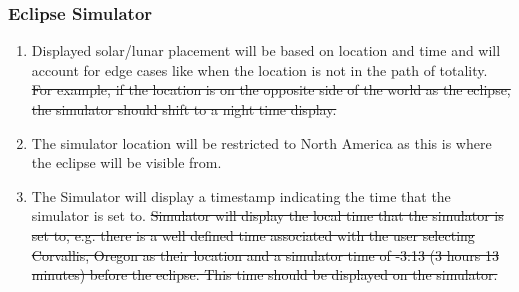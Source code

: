 \documentclass[10pt, onecolumn, draftclsnofoot, letterpaper, compsoc]{IEEEtran}
\begin{document}
\subsubsection{Eclipse Simulator}
	\begin{enumerate}
		\item Displayed solar/lunar placement will be based on location and 
		time and will account for edge cases like when the location is not in 
		the path of totality. \sout{For example, if the location is on the opposite 
		side of the world as the eclipse, the simulator should shift to a night
		time display.}

		\item The simulator location will be restricted to North America as this is where
		the eclipse will be visible from.

		\item The Simulator will display a timestamp indicating the time that the simulator
		is set to. 
		\sout{Simulator will display the local time that the simulator is set 
		to, e.g. there is a well defined time associated with the user 
		selecting Corvallis, Oregon as their location and a simulator time of 
		-3:13 (3 hours 13 minutes) before the eclipse. This time should be 
		displayed on the simulator.}
	\end{enumerate}
\end{document}
